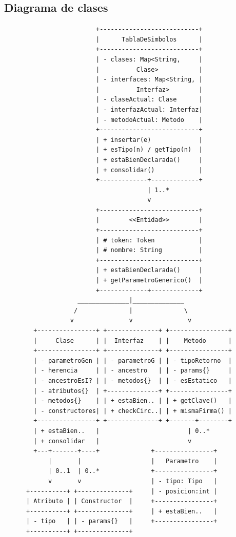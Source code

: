 \documentclass[11pt,a4paper]{article}
\begin{document}
\subsection{Diagrama de clases}

{\footnotesize
\begin{verbatim}
                         +---------------------------+
                         |      TablaDeSimbolos      |
                         +---------------------------+
                         | - clases: Map<String,     |
                         |          Clase>           |
                         | - interfaces: Map<String, |
                         |          Interfaz>        |
                         | - claseActual: Clase      |
                         | - interfazActual: Interfaz|
                         | - metodoActual: Metodo    |
                         +---------------------------+
                         | + insertar(e)             |
                         | + esTipo(n) / getTipo(n)  |
                         | + estaBienDeclarada()     |
                         | + consolidar()            |
                         +-------------+-------------+
                                       | 1..*
                                       v
                         +---------------------------+
                         |        <<Entidad>>        |
                         +---------------------------+
                         | # token: Token            |
                         | # nombre: String          |
                         +---------------------------+
                         | + estaBienDeclarada()     |
                         | + getParametroGenerico()  |
                         +-------------+-------------+
                    ______________|______________
                   /              |              \
                  v               v               v
        +----------------+ +--------------+ +----------------+
        |     Clase      | |  Interfaz    | |    Metodo      |
        +----------------+ +--------------+ +----------------+
        | - parametroGen | | - parametroG | | - tipoRetorno  |
        | - herencia     | | - ancestro   | | - params{}     |
        | - ancestroEsI? | | - metodos{}  | | - esEstatico   |
        | - atributos{}  | +--------------+ +----------------+
        | - metodos{}    | | + estaBien.. | | + getClave()   |
        | - constructores| | + checkCirc..| | + mismaFirma() |
        +----------------+ +--------------+ +-------+--------+
        | + estaBien..   |                        | 0..*
        | + consolidar   |                        v
        +---+-------+----+              +----------------+
            |       |                   |   Parametro    |
            | 0..1  | 0..*              +----------------+
            v       v                   | - tipo: Tipo   |
      +----------+ +--------------+     | - posicion:int |
      | Atributo | | Constructor  |     +----------------+
      +----------+ +--------------+     | + estaBien..   |
      | - tipo   | | - params{}   |     +----------------+
      +----------+ +--------------+


\end{verbatim}}
\end{document}
